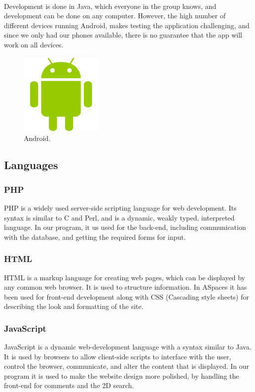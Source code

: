 \paragraph{} Development is done in Java, which everyone in the group knows, and development can be done on any computer. However, the high number of different devices running Android, makes testing the application challenging, and since we only had our phones available, there is no guarantee that the app will work on all devices.

\begin{figure}[ht!]
  \centering
  \includegraphics[width=40mm]{./Planning/img/AndroidLogo}
  \caption{Android.}
  \label{fig:PlanningSoftwareDevAndroid}
\end{figure}


\subsection{Languages}
\label{subsec:PlanningSoftwareDevLanguages}

\subsubsection{PHP} PHP is a widely used server-side scripting language for web development. Its syntax is similar to C and Perl, and is a dynamic, weakly typed, interpreted language. In our program, it us used for the back-end, including communication with the database, and getting the required forms for input.

\subsubsection{HTML} HTML is a markup language for creating web pages, which can be displayed by any common web browser. It is used to structure information. In ASpaces it has been used for front-end development along with CSS (Cascading style sheets) for describing the look and formatting of the site.

\subsubsection{JavaScript} JavaScript is a dynamic web-development language with a syntax similar to Java. It is used by browsers to allow client-side scripts to interface with the user, control the browser, communicate, and alter the content that is displayed. In our program it is used to make the website design more polished, by handling the front-end for comments and the 2D search.

